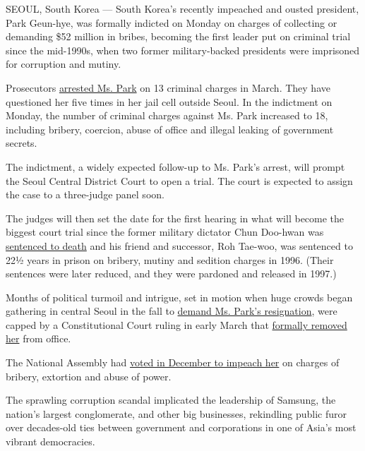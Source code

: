 SEOUL, South Korea --- South Korea's recently impeached and ousted
president, Park Geun-hye, was formally indicted on Monday on charges of
collecting or demanding \$52 million in bribes, becoming the first
leader put on criminal trial since the mid-1990s, when two former
military-backed presidents were imprisoned for corruption and mutiny.

Prosecutors
\href{https://www.nytimes3xbfgragh.onion/2017/03/30/world/asia/park-geun-hye-south-korea-arrest.html}{arrested
Ms. Park} on 13 criminal charges in March. They have questioned her five
times in her jail cell outside Seoul. In the indictment on Monday, the
number of criminal charges against Ms. Park increased to 18, including
bribery, coercion, abuse of office and illegal leaking of government
secrets.

The indictment, a widely expected follow-up to Ms. Park's arrest, will
prompt the Seoul Central District Court to open a trial. The court is
expected to assign the case to a three-judge panel soon.

The judges will then set the date for the first hearing in what will
become the biggest court trial since the former military dictator Chun
Doo-hwan was
\href{http://www.nytimes3xbfgragh.onion/1995/12/22/world/south-korea-indicts-2-former-presidents-in-staging-of-1979-coup.html}{sentenced
to death} and his friend and successor, Roh Tae-woo, was sentenced to
22½ years in prison on bribery, mutiny and sedition charges in 1996.
(Their sentences were later reduced, and they were pardoned and released
in 1997.)

Months of political turmoil and intrigue, set in motion when huge crowds
began gathering in central Seoul in the fall to
\href{https://www.nytimes3xbfgragh.onion/2016/11/26/world/asia/korea-park-geun-hye-protests.html}{demand
Ms. Park's resignation}, were capped by a Constitutional Court ruling in
early March that
\href{https://www.nytimes3xbfgragh.onion/2017/03/09/world/asia/park-geun-hye-impeached-south-korea.html}{formally
removed her} from office.

The National Assembly had
\href{https://www.nytimes3xbfgragh.onion/2016/12/09/world/asia/south-korea-president-park-geun-hye-impeached.html}{voted
in December to impeach her} on charges of bribery, extortion and abuse
of power.

The sprawling corruption scandal implicated the leadership of Samsung,
the nation's largest conglomerate, and other big businesses, rekindling
public furor over decades-old ties between government and corporations
in one of Asia's most vibrant democracies.

